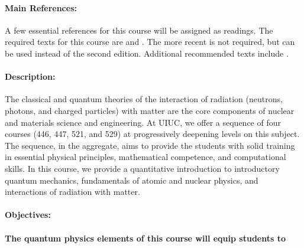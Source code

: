\documentclass[11pt]{article}
\begin{document}
\paragraph{Main References:}
A few essential references for this course will be assigned as readings. The 
required texts for this course are \cite{griffiths_introduction_2004} and 
\cite{yip_nuclear_2014}. The more recent \cite{griffiths_introduction_2018} is not 
required, but can be used instead of the second edition. Additional
recommended texts include \cite{krane_introductory_1987,eisberg_quantum_1985,evans_atomic_1955}.

\renewcommand{\refname}{\normalfont\selectfont\normalsize}\vspace{-1cm} 


\paragraph{Description:}
The classical and quantum theories of the interaction of radiation (neutrons, photons, and
charged particles) with matter are the core components of nuclear and materials science
and engineering. At UIUC, we offer a sequence of four courses (446, 447, 521, and 529)
at progressively deepening levels on this subject. The sequence, in the aggregate, aims to
provide the students with solid training in essential physical principles, mathematical
competence, and computational skills. In this course, we provide a quantitative
introduction to introductory quantum mechanics, fundamentals of atomic and nuclear
physics, and interactions of radiation with matter.

\paragraph{Objectives:} 

\paragraph{The quantum physics elements of this course will equip students to}
\end{document}
